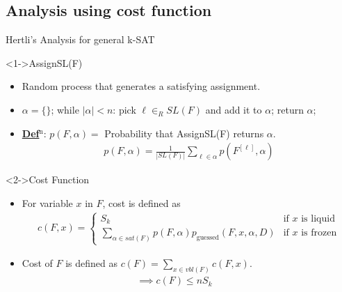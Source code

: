 \documentclass[
	xcolor={svgnames},
	hyperref={pagebackref,bookmarks},
	aspectratio=43,
]{beamer}
\begin{document}
\subsection*{Analysis using cost function}
\begin{frame}{Hertli's Analysis for general k-SAT}
	\vspace{-2.5mm}
	\begin{block}<1->{AssignSL(F)}
		\begin{itemize}
			\item Random process that generates a satisfying assignment.
			\item $\alpha = \{\}$; while $|\alpha| < n$: pick $\ell \in_R SL(F)$ and add it to $\alpha$; return $\alpha$;
			\item \underline{\textbf{Def$^\text{n}$}}: $p(F, \alpha) = $ Probability that AssignSL(F) returns $\alpha$.
			\vspace{-3mm}
			\begin{align}
				p(F, \alpha) = \frac{1}{|SL(F)|} \sum_{\ell \in \alpha} p(F^{[\ell]}, \alpha)
			\end{align}
		\end{itemize}
	\end{block}
	\vspace{-2mm}
	\begin{block}<2->{Cost Function}
		\begin{itemize}
			\item For variable $x$ in $F$, cost is defined as
			\vspace{-3mm}
			\begin{align}
				c(F, x) = \begin{cases}
					S_k & \text{if $x$ is liquid} \\
					\sum\limits_{\alpha \in sat(F)} p(F, \alpha) p_{\text{guessed}}(F, x, \alpha, D) & \text{if $x$ is frozen}
				\end{cases}
			\end{align}
			\vspace{-5.5mm}
			\item Cost of $F$ is defined as $c(F) = \sum_{x \in vbl(F)} c(F, x)$. \vspace{-2.5mm}
			\begin{align}
				\implies c(F) \leq n S_k \qquad\quad
			\end{align}
		\end{itemize}
	\end{block}
\end{frame}
\end{document}
